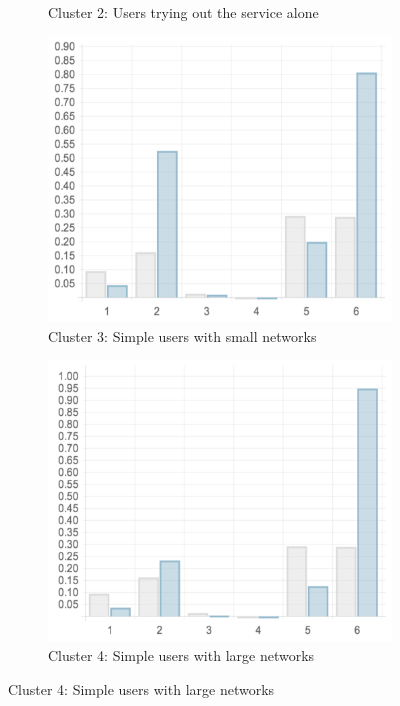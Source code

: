 \begin{figure}
\begin{subfigure}[t]{0.45\textwidth}
    \caption{Cluster 2: Users trying out the service alone}
    \label{fig:cluster2-chart}
  \end{subfigure}

  \begin{subfigure}[t]{0.45\textwidth}
    \includegraphics[width=\textwidth]{Figures/clusterings/confluence-post/cluster3-chart}
    \caption{Cluster 3: Simple users with small networks}
    \label{fig:cluster3-chart}
  \end{subfigure}
  \hfill
  \begin{subfigure}[t]{0.45\textwidth}
    \includegraphics[width=\textwidth]{Figures/clusterings/confluence-post/cluster4-chart}
    \caption{Cluster 4: Simple users with large networks}
    \label{fig:cluster4-chart}
  \end{subfigure}


\end{figure}

